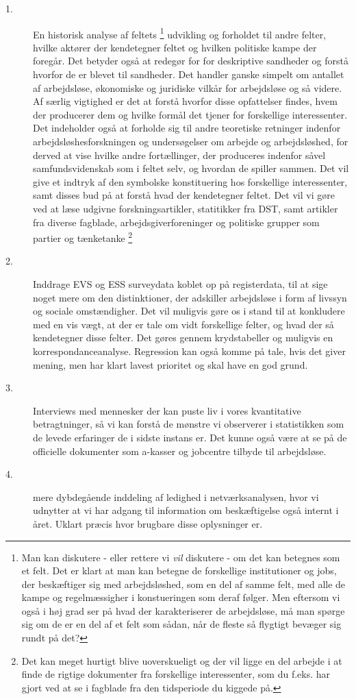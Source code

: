 %
\begin{description}
  \item[1.] En historisk analyse af feltets%
  \footnote{Man kan diskutere - eller rettere vi \emph{vil} diskutere - om det kan betegnes som et felt. Det er klart at man kan betegne de forskellige institutioner og jobs, der beskæftiger sig med arbejdsløshed, som en del af samme felt, med alle de kampe og regelmæssigher i konstueringen som deraf følger. Men eftersom vi også i høj grad ser på hvad der karakteriserer de arbejdsløse, må man spørge sig om de er en del af et felt som sådan, når de fleste så flygtigt bevæger sig rundt på det?}%
   udvikling og forholdet til andre felter, hvilke aktører der kendetegner feltet og hvilken politiske kampe der foregår. Det betyder også at redegør for for deskriptive sandheder og forstå hvorfor de er blevet til sandheder. Det handler ganske simpelt om antallet af arbejdsløse, økonomiske og juridiske vilkår for arbejdsløse og så videre. Af særlig vigtighed er det at forstå hvorfor disse opfattelser findes, hvem der producerer dem og hvilke formål det tjener for forskellige interessenter. Det indeholder også at forholde sig til andre teoretiske retninger indenfor arbejdsløshesforskningen og undersøgelser om arbejde og arbejdsløshed, for derved at vise hvilke andre fortællinger, der produceres indenfor såvel samfundsvidenskab som i feltet selv, og hvordan de spiller sammen. Det vil give et indtryk af den symbolske konstituering hos forskellige interessenter, samt disses bud på at forstå hvad der kendetegner feltet. Det vil vi gøre ved at læse udgivne forskningsartikler, statitikker fra DST, samt artikler fra diverse fagblade, arbejdsgiverforeninger og politiske grupper som partier og tænketanke%
%
\footnote{Det kan meget hurtigt blive uoverskueligt og der vil ligge en del arbejde i at finde de rigtige dokumenter fra forskellige interessenter, som du f.eks. har gjort ved at se i fagblade fra den tidsperiode du kiggede på.}%
%
\ 
  \item[2.] Inddrage EVS og ESS surveydata koblet op på registerdata, til at sige noget mere om den distinktioner, der adskiller arbejdsløse i form af livssyn og sociale omstændigher. Det vil muligvis gøre os i stand til at konkludere med en vis vægt, at der er tale om vidt forskellige felter, og hvad der så kendetegner disse felter. Det gøres gennem krydstabeller og muligvis en korrespondanceanalyse. Regression kan også komme på tale, hvis det giver mening, men har klart lavest prioritet og skal have en god grund.
  \item[3.] Interviews med mennesker der kan puste liv i vores kvantitative betragtninger, så vi kan forstå de mønstre vi observerer i statistikken som de levede erfaringer de i sidste instans er. Det kunne også være at se på de officielle dokumenter som a-kasser og jobcentre tilbyde til arbejdsløse.
  \item[4.] mere dybdegående inddeling af ledighed i netværksanalysen, hvor vi udnytter at vi har adgang til information om beskæftigelse også internt i året. Uklart præcis hvor brugbare disse oplysninger er.
\end{description}
%

